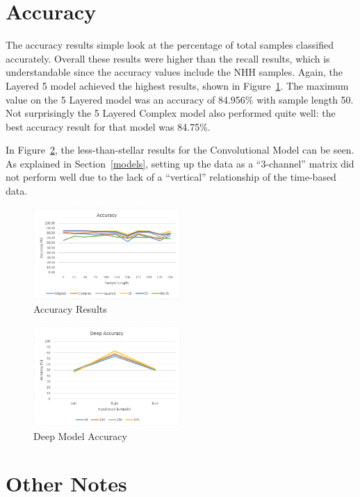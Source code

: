 \documentclass[]{report}
\begin{document}
\section{Accuracy}

The accuracy results simple look at the percentage of total samples classified accurately. Overall these results were higher than the recall results, which is understandable since the accuracy values include the NHH samples. Again, the Layered 5 model achieved the highest results, shown in Figure~\ref{accuracy}. The maximum value on the 5 Layered model was an accuracy of 84.956\% with sample length 50. Not surprisingly the 5 Layered Complex model also performed quite well: the best accuracy result for that model was 84.75\%.

In Figure~\ref{acuracy-deep}, the less-than-stellar results for the Convolutional Model can be seen. As explained in Section~\ref{models}, setting up the data as a ``3-channel'' matrix did not perform well due to the lack of a ``vertical'' relationship of the time-based data.
\begin{figure}
	\centering
	\includegraphics[width=0.5\textwidth]{../images/accuracy2}
	\caption{Accuracy Results}
	\label{accuracy}
\end{figure}
\begin{figure}
	\centering
	\includegraphics[width=0.5\textwidth]{../images/deepresults}
	\caption{Deep Model Accuracy}
	\label{acuracy-deep}
\end{figure}

\section{Other Notes}
\end{document}
